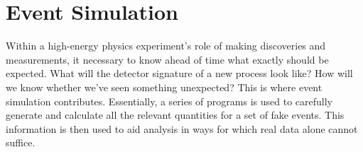 \chapter{Event Simulation}
\label{sim}









Within %
a high-energy physics experiment's role of making 
discoveries and measurements, 
it necessary to know ahead of time what exactly 
should be expected. 
What will the detector signature of a new process look like? 
How will we know whether we've seen something unexpected? 
This is where event simulation contributes.  
Essentially, a series of programs is used to carefully 
generate and calculate all the relevant quantities for a set of 
fake events.  
This information is then used 
to aid analysis in ways for which 
real data alone cannot suffice.  

